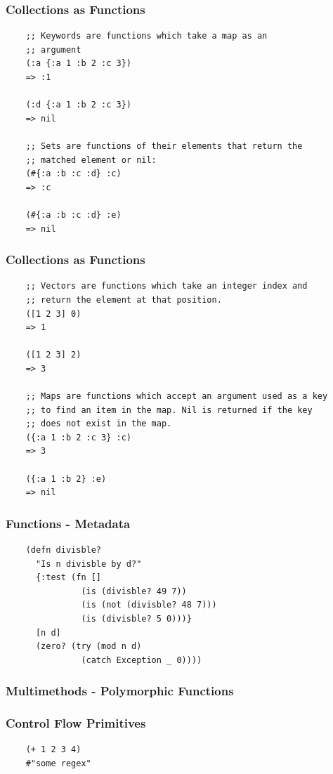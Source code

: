 \documentclass{beamer}
\begin{document}
\begin{frame}[fragile]
  \frametitle{Collections as Functions}
  \begin{verbatim}
    ;; Keywords are functions which take a map as an
    ;; argument
    (:a {:a 1 :b 2 :c 3})
    => :1

    (:d {:a 1 :b 2 :c 3})
    => nil

    ;; Sets are functions of their elements that return the 
    ;; matched element or nil: 
    (#{:a :b :c :d} :c)
    => :c

    (#{:a :b :c :d} :e)
    => nil

  \end{verbatim}
\end{frame}

\begin{frame}[fragile]
  \frametitle{Collections as Functions}
  \begin{verbatim}
    ;; Vectors are functions which take an integer index and 
    ;; return the element at that position.
    ([1 2 3] 0)
    => 1

    ([1 2 3] 2)
    => 3

    ;; Maps are functions which accept an argument used as a key 
    ;; to find an item in the map. Nil is returned if the key
    ;; does not exist in the map.
    ({:a 1 :b 2 :c 3} :c)
    => 3

    ({:a 1 :b 2} :e)
    => nil

  \end{verbatim}
\end{frame}

\begin{frame}[fragile]
  \frametitle{Functions - Metadata}
  \begin{verbatim}
    (defn divisble?
      "Is n divisble by d?"
      {:test (fn []
               (is (divisble? 49 7))
               (is (not (divisble? 48 7)))
               (is (divisble? 5 0)))}
      [n d]
      (zero? (try (mod n d)
               (catch Exception _ 0))))
  \end{verbatim}
\end{frame}


\begin{frame}
  \frametitle{Multimethods - Polymorphic Functions}
\end{frame}

\begin{frame}[fragile]
  \frametitle{Control Flow Primitives}
  \begin{verbatim}
    (+ 1 2 3 4)
    #"some regex"

  \end{verbatim}
\end{frame}
\end{document}
